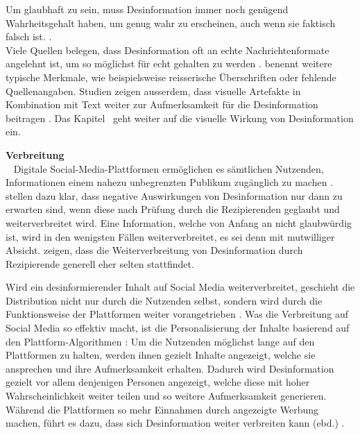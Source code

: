 \documentclass[12pt,a4paper]{article}        %
\begin{document}
Um glaubhaft zu sein, muss Desinformation immer noch genügend Wahrheitsgehalt haben, um genug wahr zu erscheinen, auch wenn sie faktisch falsch ist. \parencite[Pennycook et al. (2018), zit\ nach][182]{weidner_fake_2019}. \\
Viele Quellen belegen, dass Desinformation oft an echte Nachrichtenformate angelehnt ist, um so möglichst für echt gehalten zu werden \parencites[3]{tandoc_jr_facts_2019}[213]{allcott_social_2017}[1094]{lazer_science_2018}[10f]{grujic_warnhinweise_2024}. \textcite[15]{grujic_warnhinweise_2024} benennt weitere typische Merkmale, wie beispielsweise reisserische Überschriften oder fehlende Quellenangaben. Studien zeigen ausserdem, dass visuelle Artefakte in Kombination mit Text weiter zur Aufmerksamkeit für die Desinformation beitragen \parencites[3701]{weikmann_visual_2023}[182]{weidner_fake_2019}. Das Kapitel~ geht weiter auf die visuelle Wirkung von Desinformation ein.

\textbf{Verbreitung}\\
~\label{theory_distribution}
Digitale Social-Media-Plattformen ermöglichen es sämtlichen Nutzenden, Informationen einem nahezu unbegrenzten Publikum zugänglich zu machen \parencite[147]{marx_fake_2020}. \textcite[485]{schaewitz_when_2020} stellen dazu klar, dass negative Auswirkungen von Desinformation nur dann zu erwarten sind, wenn diese nach Prüfung durch die Rezipierenden geglaubt und weiterverbreitet wird. Eine Information, welche von Anfang an nicht glaubwürdig ist, wird in den wenigsten Fällen weiterverbreitet, es sei denn mit mutwilliger Absicht. \textcite{guess_less_2019} zeigen, dass die Weiterverbreitung von Desinformation durch Rezipierende generell eher selten stattfindet.

Wird ein desinformierender Inhalt auf Social Media weiterverbreitet, geschieht die Distribution nicht nur durch die Nutzenden selbst, sondern wird durch die Funktionsweise der Plattformen weiter vorangetrieben \parencite[vgl.\ auch][199]{krafft_disinformation_2020}.
Was die Verbreitung auf Social Media so effektiv macht, ist die Personalisierung der Inhalte basierend auf den Plattform-Algorithmen \parencite[219f]{schmidt_meinungsbildung_2022}: Um die Nutzenden möglichst lange auf den Plattformen zu halten, werden ihnen gezielt Inhalte angezeigt, welche sie ansprechen und ihre Aufmerksamkeit erhalten. Dadurch wird Desinformation gezielt vor allem denjenigen Personen angezeigt, welche diese mit hoher Wahrscheinlichkeit weiter teilen und so weitere Aufmerksamkeit generieren. Während die Plattformen so mehr Einnahmen durch angezeigte Werbung machen, führt es dazu, dass sich Desinformation weiter verbreiten kann (ebd.) \parencite[vgl.\ auch][967]{ghai_deep-learning-based_2024}.
\end{document}
